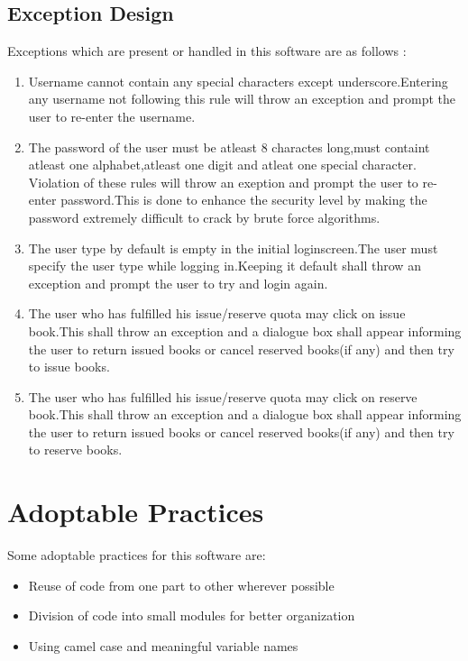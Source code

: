 \documentclass{article}
\begin{document}
\subsection{Exception Design}
Exceptions which are present or handled in this software are as follows :
\begin{enumerate}
\item Username cannot contain any special characters except underscore.Entering any username not following this rule will throw an exception and prompt the user to re-enter the username.
\item The password of the user must be atleast 8 charactes long,must containt atleast one alphabet,atleast one digit and atleat one special character. Violation of these rules will throw an exeption and prompt the user to re-enter password.This is done to enhance the security level by making the password extremely difficult to crack by brute force algorithms.
\item The user type by default is empty in the initial  loginscreen.The user must specify the user type while logging in.Keeping it default shall throw an exception and prompt the user to try and login again.
\item The user who has fulfilled his issue/reserve quota may click on issue book.This shall throw an exception and a dialogue box shall appear informing the user to return issued books or cancel reserved books(if any) and then try to issue books.
\item The user who has fulfilled his issue/reserve quota may click on reserve book.This shall throw an exception and a dialogue box shall appear informing the user to return issued books or cancel reserved books(if any) and then try to reserve books.
\end{enumerate}
\section{Adoptable Practices}
Some adoptable practices for this software are:
\begin{itemize}
\item Reuse of code from one part to other wherever possible
\item Division of code into small modules for better organization
\item Using camel case and meaningful variable names
\end{itemize}
\end{document}
